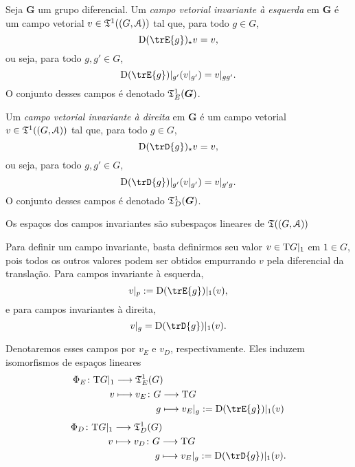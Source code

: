 \begin{definition}
Seja $\bm G$ um grupo diferencial. Um \emph{campo vetorial invariante à esquerda} em $\bm G$ é um campo vetorial $v \in \mathfrak{T}^1((G,\mathcal{A}))$ tal que, para todo $g \in G$,
	\begin{equation*}
	\D(\trE{g})\emp v = v,
	\end{equation*}
ou seja, para todo $g,g' \in G$,
	\begin{equation*}
	\D(\trE{g})|_{g'} (v|_{g'}) = v|_{gg'}.
	\end{equation*}
O conjunto desses campos é denotado $\mathfrak{T}^1_E(\bm G)$.

Um \emph{campo vetorial invariante à direita} em $\bm G$ é um campo vetorial $v \in \mathfrak{T}^1((G,\mathcal{A}))$ tal que, para todo $g \in G$,
	\begin{equation*}
	\D(\trD{g})\emp v = v,
	\end{equation*}
ou seja, para todo $g,g' \in G$,
	\begin{equation*}
	\D(\trD{g})|_{g'} (v|_{g'}) = v|_{g'g}.
	\end{equation*}
O conjunto desses campos é denotado $\mathfrak{T}^1_D(\bm G)$.
\end{definition}


Os espaços dos campos invariantes são subespaços lineares de $\mathfrak{T}((G,\mathcal{A}))$

Para definir um campo invariante, basta definirmos seu valor $v \in \mathrm{T} G|_1$ em $1 \in G$, pois todos os outros valores podem ser obtidos empurrando $v$ pela diferencial da translação. Para campos invariante à esquerda,
	\begin{equation*}
	v|_p := \D(\trE{g})|_{1} (v),
	\end{equation*}
e para campos invariantes à direita,
	\begin{equation*}
	v|_{g} = \D(\trD{g})|_{1} (v).
	\end{equation*}

Denotaremos esses campos por $v_E$ e $v_D$, respectivamente. Eles induzem isomorfismos de espaços lineares
	\begin{align*}
	\func{\Phi_E}{\Tg G|_1}{\tens^1_E(G)}{v}{
		\begin{aligned}[t]
		\func{v_E}{G}{\Tg G}{g}{v_E|_g := \D(\trE{g})|_{1} (v)}
		\end{aligned}
	}
	\end{align*}
	\begin{align*}
	\func{\Phi_D}{\Tg G|_1}{\tens^1_D(G)}{v}{
		\begin{aligned}[t]
		\func{v_D}{G}{\Tg G}{g}{v_E|_g := \D(\trD{g})|_{1} (v)}.
		\end{aligned}
	}
	\end{align*}

